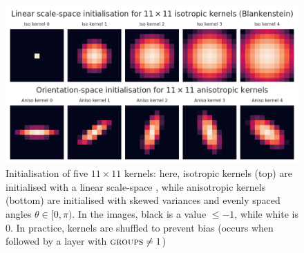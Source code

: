 \documentclass[a4paper, 12pt]{report}
\begin{document}
\begin{figure}[b!]
	\center
  \includegraphics[width=\textwidth]{figures/initialisation.png}
  \caption{Initialisation of five $11\times11$ kernels: here, isotropic kernels (top) are initialised with a linear scale-space \cite{thierrybsc}, while anisotropic kernels (bottom) are initialised with skewed variances and evenly spaced angles  $\theta \in [0, \pi)$. In the images, black is a value  $\leq-1$, while white is 0. In practice, kernels are shuffled to prevent bias (occurs when followed by a layer with $\textsc{groups}\neq1$)}
  \label{fig:init}
\end{figure}

\newpage
\end{document}
